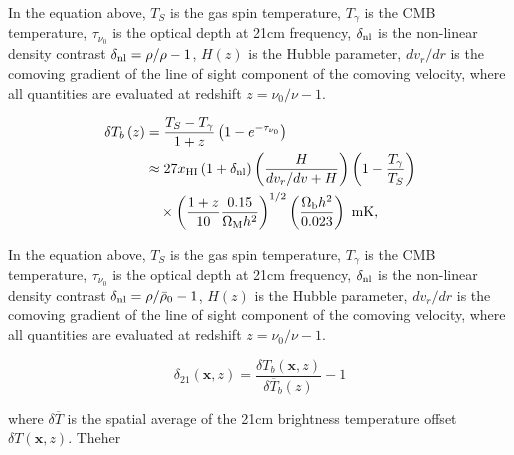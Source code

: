 
In the equation above, $T_S$ is the gas spin temperature, $T_{\gamma}$ is the
CMB temperature, $\tau_{\nu_0}$ is the optical depth at 21cm frequency, $\delta_{\rm nl}$
is the non-linear density contrast $\delta_{\rm nl} = \rho / \rho - 1$, $H \left( z \right)$
is the Hubble parameter, $dv_r / dr$ is the comoving gradient of the line of sight component
of the comoving velocity, where all quantities are evaluated at redshift $z = \nu_0 / \nu - 1$.


\begin{align}
  \delta T_b \left(z \right) & = \frac{T_S - T_{\gamma}}{1+z} \left(1 - e^{-\tau_{\nu_0}} \right ) \nonumber \\
      & \approx 27 x_{\rm HI} \left( 1 + \delta_{\rm nl} \right) \left( \frac{H}{dv_r/dv + H}\right) \left( 1 - \frac{T_{\gamma}}{T_S}\right) \nonumber \\
      & \hspace{1em} \times \left( \frac{1 + z}{10} \frac{0.15}{\Omega_{\rm M} h^2} \right)^{1/2} \left( \frac{\Omega_{\rm b} h^2}{0.023} \right) \textrm{ mK,}
\end{align}

In the equation above, $T_S$ is the gas spin temperature, $T_{\gamma}$ is the
CMB temperature, $\tau_{\nu_0}$ is the optical depth at 21cm frequency, $\delta_{\rm nl}$
is the non-linear density contrast $\delta_{\rm nl} = \rho / \bar{\rho}_0 - 1$, $H \left( z \right)$
is the Hubble parameter, $dv_r / dr$ is the comoving gradient of the line of sight component
of the comoving velocity, where all quantities are evaluated at redshift $z = \nu_0 / \nu - 1$.

\begin{equation}
\delta_{21} \left( \mathbf{x}, z\right) = \frac{ \delta T_b \left( \mathbf{x}, z\right)}{\delta \overline{T}_b \left( z \right)} - 1
\end{equation}

where $\delta \overline{T}$ is the spatial average of the 21cm brightness temperature offset
$\delta T \left( \mathbf{x}, z\right)$. Theher
